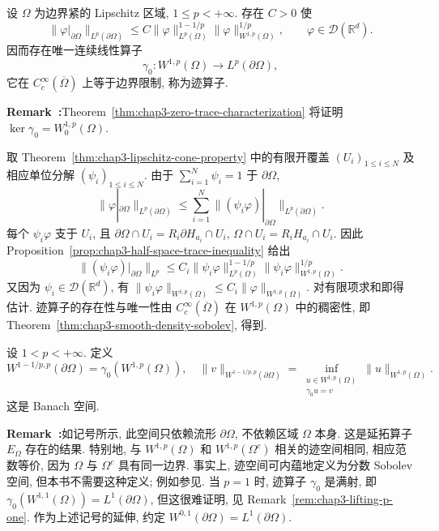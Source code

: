 \begin{Theorem}
\label{thm:chap3-trace-operator}
设 $\Omega$ 为边界紧的 Lipschitz 区域, $1\leq p<+\infty$. 存在 $C>0$ 使
\[
 \|\varphi|_{\partial\Omega}\|_{L^p(\partial\Omega)}
 \leq C\|\varphi\|_{L^p(\Omega)}^{1-1/p}
 \|\varphi\|_{W^{1,p}(\Omega)}^{1/p},
 \qquad\varphi\in\mathcal D(\mathbb R^d).
\]
因而存在唯一连续线性算子
\[
 \gamma_0:W^{1,p}(\Omega)\longrightarrow L^p(\partial\Omega),
\]
它在 $C_c^\infty(\overline\Omega)$ 上等于边界限制, 称为迹算子.
\end{Theorem}

\par\noindent{}\textbf{Remark~\thechapterthreesectiontworemark:}\label{rem:chap3-trace-kernel}\quad Theorem~\ref{thm:chap3-zero-trace-characterization} 将证明 $\ker\gamma_0=W_0^{1,p}(\Omega)$.

\begin{Proof}
取 Theorem~\ref{thm:chap3-lipschitz-cone-property} 中的有限开覆盖 $(U_i)_{1\leq i\leq N}$ 及相应单位分解 $(\psi_i)_{1\leq i\leq N}$. 由于 $\sum_{i=1}^N\psi_i=1$ 于 $\partial\Omega$,
\[
 \|\varphi|_{\partial\Omega}\|_{L^p(\partial\Omega)}
 \leq\sum_{i=1}^N\|(\psi_i\varphi)|_{\partial\Omega}\|_{L^p(\partial\Omega)}.
\]
每个 $\psi_i\varphi$ 支于 $U_i$, 且 $\partial\Omega\cap U_i=R_i\partial H_{a_i}\cap U_i$, $\Omega\cap U_i=R_iH_{a_i}\cap U_i$. 因此 Proposition~\ref{prop:chap3-half-space-trace-inequality} 给出
\[
 \|(\psi_i\varphi)|_{\partial\Omega}\|_{L^p}
 \leq C_i\|\psi_i\varphi\|_{L^p(\Omega)}^{1-1/p}
 \|\psi_i\varphi\|_{W^{1,p}(\Omega)}^{1/p}.
\]
又因为 $\psi_i\in\mathcal D(\mathbb R^d)$, 有 $\|\psi_i\varphi\|_{W^{1,p}(\Omega)}\leq C_i\|\varphi\|_{W^{1,p}(\Omega)}$. 对有限项求和即得估计. 迹算子的存在性与唯一性由 $C_c^\infty(\overline\Omega)$ 在 $W^{1,p}(\Omega)$ 中的稠密性, 即 Theorem~\ref{thm:chap3-smooth-density-sobolev}, 得到.
\end{Proof}

\begin{Definition}
\label{def:chap3-boundary-trace-space}
设 $1<p<+\infty$. 定义
\[
 W^{1-1/p,p}(\partial\Omega)=\gamma_0(W^{1,p}(\Omega)),
 \quad
 \|v\|_{W^{1-1/p,p}(\partial\Omega)}
 =\inf_{\substack{u\in W^{1,p}(\Omega)\\\gamma_0u=v}}\|u\|_{W^{1,p}(\Omega)}.
\]
这是 Banach 空间.
\end{Definition}

\par\noindent{}\textbf{Remark~\thechapterthreesectiontworemark:}\label{rem:chap3-intrinsic-trace-space}\quad 如记号所示, 此空间只依赖流形 $\partial\Omega$, 不依赖区域 $\Omega$ 本身. 这是延拓算子 $E_\Omega$ 存在的结果. 特别地, 与 $W^{1,p}(\Omega)$ 和 $W^{1,p}(\Omega^c)$ 相关的迹空间相同, 相应范数等价, 因为 $\Omega$ 与 $\Omega^c$ 具有同一边界. 事实上, 迹空间可内蕴地定义为分数 Sobolev 空间, 但本书不需要这种定义; 例如参见. 当 $p=1$ 时, 迹算子 $\gamma_0$ 是满射, 即 $\gamma_0(W^{1,1}(\Omega))=L^1(\partial\Omega)$, 但这很难证明, 见 Remark~\ref{rem:chap3-lifting-p-one}. 作为上述记号的延伸, 约定 $W^{0,1}(\partial\Omega)=L^1(\partial\Omega)$.


